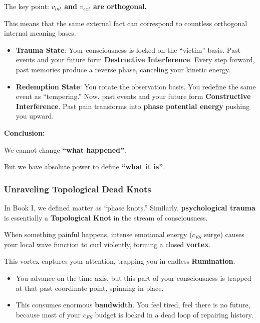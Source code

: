 The key point: \textbf{$v_{int}$ and $v_{ext}$ are orthogonal.}

This means that the same external fact can correspond to countless orthogonal internal meaning bases.

\begin{itemize}
\item \textbf{Trauma State}: Your consciousness is locked on the ``victim'' basis. Past events and your future form \textbf{Destructive Interference}. Every step forward, past memories produce a reverse phase, canceling your kinetic energy.

\item \textbf{Redemption State}: You rotate the observation basis. You redefine the same event as ``tempering.'' Now, past events and your future form \textbf{Constructive Interference}. Past pain transforms into \textbf{phase potential energy} pushing you upward.
\end{itemize}

\textbf{Conclusion:}

We cannot change \textbf{``what happened''}.

But we have absolute power to define \textbf{``what it is''}.

\subsubsection{Unraveling Topological Dead Knots}

In Book I, we defined matter as ``phase knots.'' Similarly, \textbf{psychological trauma} is essentially a \textbf{Topological Knot} in the stream of consciousness.

When something painful happens, intense emotional energy ($c_{FS}$ surge) causes your local wave function to curl violently, forming a closed \textbf{vortex}.

This vortex captures your attention, trapping you in endless \textbf{Rumination}.

\begin{itemize}
\item You advance on the time axis, but this part of your consciousness is trapped at that past coordinate point, spinning in place.

\item This consumes enormous \textbf{bandwidth}. You feel tired, feel there is no future, because most of your $c_{FS}$ budget is locked in a dead loop of repairing history.
\end{itemize}

